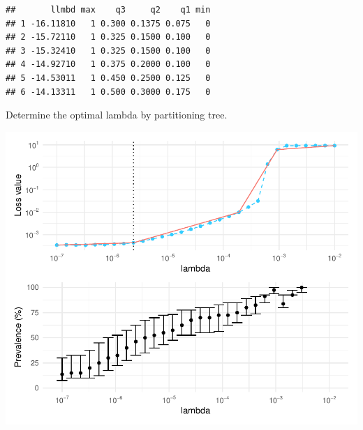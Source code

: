 \documentclass[
]{article}
\newenvironment{Shaded}{\begin{snugshade}}{\end{snugshade}}
\newcommand{\AttributeTok}[1]{\textcolor[rgb]{0.13,0.29,0.53}{#1}}
\newcommand{\DecValTok}[1]{\textcolor[rgb]{0.00,0.00,0.81}{#1}}
\newcommand{\FunctionTok}[1]{\textcolor[rgb]{0.13,0.29,0.53}{\textbf{#1}}}
\newcommand{\NormalTok}[1]{#1}
\newcommand{\OtherTok}[1]{\textcolor[rgb]{0.56,0.35,0.01}{#1}}
\newcommand{\SpecialCharTok}[1]{\textcolor[rgb]{0.81,0.36,0.00}{\textbf{#1}}}
\begin{document}
\begin{Shaded}
\end{Shaded}

\begin{verbatim}
##       llmbd max    q3     q2    q1 min
## 1 -16.11810   1 0.300 0.1375 0.075   0
## 2 -15.72110   1 0.325 0.1500 0.100   0
## 3 -15.32410   1 0.325 0.1500 0.100   0
## 4 -14.92710   1 0.375 0.2000 0.100   0
## 5 -14.53011   1 0.450 0.2500 0.125   0
## 6 -14.13311   1 0.500 0.3000 0.175   0
\end{verbatim}

Determine the optimal lambda by partitioning tree.

\begin{Shaded}
\end{Shaded}

\includegraphics{workshop_files/figure-latex/unnamed-chunk-47-1.pdf}
\end{document}
